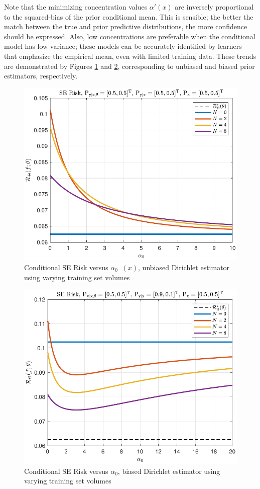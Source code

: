 \documentclass{article}
\DeclareMathOperator{\alpham}{\alpha_\text{m}}
\begin{document}
Note that the minimizing concentration values $\alpha'(x)$ are inversely proportional to the squared-bias of the prior conditional mean. This is sensible; the better the match between the true and prior predictive distributions, the more confidence should be expressed. Also, low concentrations are preferable when the conditional model has low variance; these models can be accurately identified by learners that emphasize the empirical mean, even with limited training data. These trends are demonstrated by Figures \ref{fig:Risk_cond_SE_Dir_a0_leg_N_unbiased} and \ref{fig:Risk_cond_SE_Dir_a0_leg_N_biased}, corresponding to unbiased and biased prior estimators, respectively.
\begin{figure}
	\centering
	\includegraphics[width=0.9\linewidth]{Risk_cond_SE_Dir_a0_leg_N_unbiased.pdf}
	\caption{Conditional SE Risk versus $\alpha_0 \alpham(x)$, unbiased Dirichlet estimator using varying training set volumes}
	\label{fig:Risk_cond_SE_Dir_a0_leg_N_unbiased}
\end{figure}
\begin{figure}
	\centering
	\includegraphics[width=0.9\linewidth]{Risk_cond_SE_Dir_a0_leg_N_biased.pdf}
	\caption{Conditional SE Risk versus $\alpha_0$, biased Dirichlet estimator using varying training set volumes}
	\label{fig:Risk_cond_SE_Dir_a0_leg_N_biased}
\end{figure}
\end{document}
